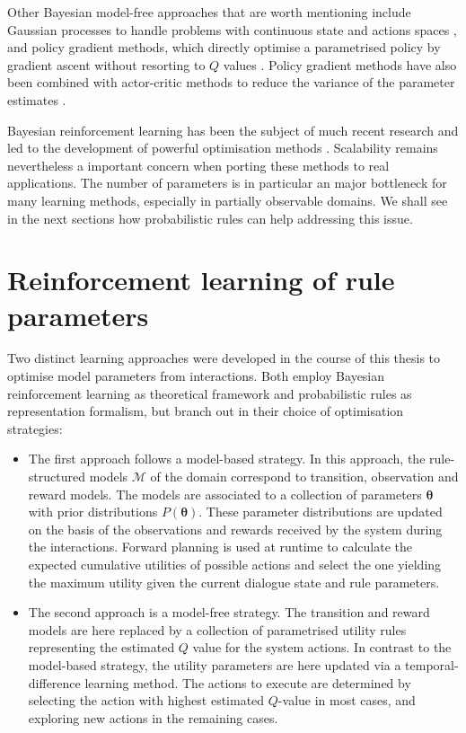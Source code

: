 Other Bayesian model-free approaches that are worth mentioning include Gaussian processes to handle problems with continuous state and actions spaces \citep{Engel:2005}, and policy gradient methods, which directly optimise a parametrised policy by gradient ascent without resorting to $Q$ values \citep{bb-ihgbps-01,GhavamzadehE06}.  Policy gradient methods have also been combined with actor-critic methods to reduce the variance of the parameter estimates \citep{Ghavamzadeh:2007}.

Bayesian reinforcement learning has been the subject of much recent research and led to the development of powerful optimisation methods \cite[see e.g.][for a detailed survey]{brl2012}. Scalability remains nevertheless a important concern when porting these methods to real applications.  The number of parameters is in particular an major bottleneck for many learning methods, especially in partially observable domains. We shall see in the next sections how probabilistic rules can help addressing this issue. 

\section{Reinforcement learning of rule parameters}
\label{sec:rl-ruleparams}

Two distinct learning approaches were developed in the course of this thesis to optimise model parameters from interactions. Both employ Bayesian reinforcement learning as theoretical framework and probabilistic rules as representation formalism, but branch out in their choice of optimisation strategies:

\begin{itemize}
\item The first approach follows a model-based strategy.  In this approach, the rule-structured models $\mathcal{M}$ of the domain correspond to transition, observation and reward models. The models are associated to a collection of parameters $\boldsymbol\theta$ with prior distributions $P(\boldsymbol\theta)$.  These parameter distributions are updated on the basis of the observations and rewards received by the system during the interactions. Forward planning is used at runtime to calculate the expected cumulative utilities of possible actions and select the one yielding the maximum utility given the current dialogue state and rule parameters. 

\item The second approach is a model-free strategy.  The transition and reward models are here replaced by  a collection of parametrised utility rules representing the estimated $Q$ value for the system actions. In contrast to the model-based strategy, the utility parameters are here updated via a temporal-difference learning method.  The actions to execute are determined by selecting the action with highest estimated $Q$-value in most cases, and exploring new actions in the remaining cases. 
\end{itemize}

